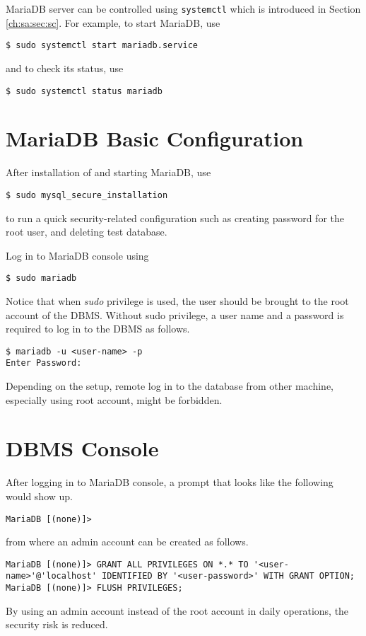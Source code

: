 MariaDB server can be controlled using \verb|systemctl| which is introduced in Section \ref{ch:sa:sec:sc}. For example, to start MariaDB, use
\begin{lstlisting}
$ sudo systemctl start mariadb.service
\end{lstlisting}
and to check its status, use
\begin{lstlisting}
$ sudo systemctl status mariadb
\end{lstlisting}

\section{MariaDB Basic Configuration}

After installation of and starting MariaDB, use
\begin{lstlisting}
$ sudo mysql_secure_installation
\end{lstlisting}
to run a quick security-related configuration such as creating password for the root user, and deleting test database.

Log in to MariaDB console using
\begin{lstlisting}
$ sudo mariadb
\end{lstlisting}
Notice that when \textit{sudo} privilege is used, the user should be brought to the root account of the DBMS. Without sudo privilege, a user name and a password is required to log in to the DBMS as follows.
\begin{lstlisting}
$ mariadb -u <user-name> -p
Enter Password:
\end{lstlisting}
Depending on the setup, remote log in to the database from other machine, especially using root account, might be forbidden.

\section{DBMS Console}

After logging in to MariaDB console, a prompt that looks like the following would show up.
\begin{lstlisting}
MariaDB [(none)]>
\end{lstlisting}
from where an admin account can be created as follows.
\begin{lstlisting}
MariaDB [(none)]> GRANT ALL PRIVILEGES ON *.* TO '<user-name>'@'localhost' IDENTIFIED BY '<user-password>' WITH GRANT OPTION;
MariaDB [(none)]> FLUSH PRIVILEGES;
\end{lstlisting}
By using an admin account instead of the root account in daily operations, the security risk is reduced.

